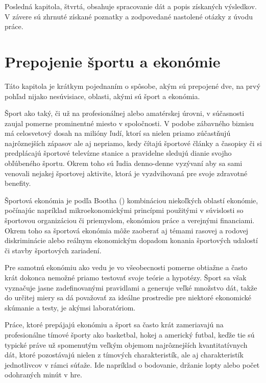 \documentclass[
  digital, %
  oneside, %
  notable,   %
  lof,     %
  lot,     %
]{fithesis3}
\begin{document}
	Posledná kapitola, štvrtá, obsahuje spracovanie dát a popis získaných výsledkov. V závere sú zhrnuté získané poznatky a zodpovedané nastolené otázky z úvodu práce.
	

	\chapter{Prepojenie športu a ekonómie}
	Táto kapitola je krátkym pojednaním o spôsobe, akým sú prepojené dve, na prvý pohľad nijako nesúvisiace, oblasti, akými sú šport a ekonómia.
	
	Šport ako taký, či už na profesionálnej alebo amatérskej úrovni, v súčasnosti zaujal pomerne prominentné miesto v spoločnosti. V podobe zábavného biznisu má celosvetový dosah na milióny ľudí, ktorí sa nielen priamo zúčastňujú najrôznejších zápasov ale aj nepriamo, kedy čítajú športové články a časopisy či si predplácajú športové televízne stanice a pravidelne sledujú dianie svojho obľúbeného športu. \parencite{conrad2011} Okrem toho sú ľudia denno-denne vyzývaní aby sa sami venovali nejakej športovej aktivite, ktorá je vyzdvihovaná pre svoje zdravotné benefity.
	
	Športová ekonómia je podľa Bootha (\citeyear{booth2009}) kombináciou niekoľkých oblastí ekonómie, počínajúc napríklad mikroekonomickými princípmi použitými v súvislosti so športovou organizáciou či priemyslom, ekonómiou práce a verejnými financiami. Okrem toho sa športová ekonómia môže zaoberať aj témami rasovej a rodovej diskriminácie alebo reálnym ekonomickým dopadom konania športových udalostí či stavby športových zariadení. 
	
	Pre samotnú ekonómiu ako vedu je vo všeobecnosti pomerne obtiažne a často krát dokonca nemožné  priamo testovať svoje teórie a hypotézy. Šport sa však vyznačuje jasne zadefinovanými pravidlami a generuje veľké množstvo dát, takže do určitej miery sa dá považovať za ideálne prostredie pre niektoré ekonomické skúmanie a testy, je akýmsi laboratóriom.
	
	Práce, ktoré prepájajú ekonómiu a šport sa často krát zameriavajú na profesionálne tímové športy ako basketbal, hokej a americký futbal, keďže tie sú typické práve už spomenutým veľkým objemom najrôznejších kvantitatívnych dát, ktoré pozostávajú nielen z tímových charakteristík, ale aj charakteristík jednotlivcov v rámci súťaže. Ide napríklad o bodovanie, držanie lopty alebo počet odohraných minút v hre.
	
\end{document}
